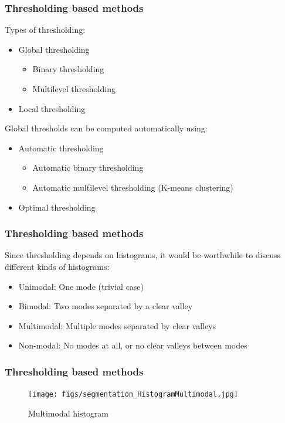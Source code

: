 \begin{frame}\frametitle{Thresholding based methods}
\logoCSIPCPL\mypagenum
	Types of thresholding:
	\begin{itemize}
		\item Global thresholding
		\begin{itemize}
			\item Binary thresholding
			\item Multilevel thresholding
		\end{itemize}
		\item Local thresholding
	\end{itemize}
	
	Global thresholds can be computed automatically using:
	\begin{itemize}
		\item Automatic thresholding
		\begin{itemize}
			\item Automatic binary thresholding
			\item Automatic multilevel thresholding (K-means clustering)
		\end{itemize}
		\item Optimal thresholding
	\end{itemize}
\end{frame}





\begin{frame}
\frametitle{Thresholding based methods}
\logoCSIPCPL\mypagenum
	Since thresholding depends on histograms, it would be worthwhile to discuss different kinds of histograms:
	\begin{itemize}
		\item Unimodal: One mode (trivial case)
		\item Bimodal: Two modes separated by a clear valley
		\item Multimodal: Multiple modes separated by clear valleys
		\item Non-modal: No modes at all, or no clear valleys between modes
	\end{itemize}
\end{frame}





\begin{frame}
\frametitle{Thresholding based methods}
\logoCSIPCPL\mypagenum
	\begin{figure}[!htp]
		\texttt{[image: figs/segmentation\_HistogramMultimodal.jpg]}
		\caption{Multimodal histogram}
	\end{figure}
\end{frame}





